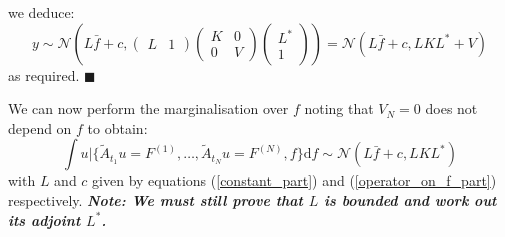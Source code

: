 \documentclass{article}
\renewcommand\qedsymbol{$\blacksquare$}
\theoremstyle{definition}
\theoremstyle{remark}
\theoremstyle{remark}
\begin{document}
we deduce:
\begin{equation*}
    y\sim\mathcal{N}\left(L\bar{f}+c, \begin{pmatrix}
        L & 1
    \end{pmatrix}\begin{pmatrix}
                    K & 0 \\
                    0 & V
                \end{pmatrix}\begin{pmatrix}
                    L^{*} \\
                    1
                \end{pmatrix}\right)=\mathcal{N}(L\bar{f}+c,LKL^{*}+V)
\end{equation*}
as required. \qedsymbol

\noindent We can now perform the marginalisation over $f$ noting that $V_N=0$ does not depend on $f$ to obtain:
\begin{equation}
    \int u|\{\tilde{A}_{t_1}u=F^{(1)},\dots,\tilde{A}_{t_N}u=F^{(N)},f\}\mathrm{d}f\sim\mathcal{N}(L\bar{f}+c,LKL^{*})
\end{equation}
with $L$ and $c$ given by equations (\ref{constant_part}) and (\ref{operator_on_f_part}) respectively. \textbf{\textit{Note: We must still prove that $L$ is bounded and work out its adjoint $L^{*}$.}}
\end{document}
